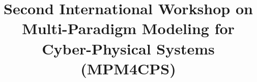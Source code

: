 
\newif\iflncs
\lncstrue

\iflncs
    
\else
    
\fi



\title{Second International Workshop on Multi-Paradigm Modeling for Cyber-Physical Systems ({MPM4CPS})}
\iflncs
\fi

\iflncs
    \author{}
    \institute{}
\else
    \author{Simon Van Mierlo}
    \affiliation{%
      \institution{University of Antwerp - Flanders Make vzw}
      \country{Belgium}
    }
    \email{simon.vanmierlo@uantwerpen.be}
    
    \author{Eugene Syriani}
    \affiliation{%
      \institution{Universit\'e de Montr\'eal}
      \country{Canada}
    }
    \email{syriani@iro.umontreal.ca}
    
    \author{Manuel Wimmer}
    \affiliation{%
      \institution{JKU Linz}
      \country{Austria}
    }
    \email{wimmer@big.tuwien.ac.at}
    
    \author{Dominique Blouin}
    \affiliation{%
        \institution{T\'el\'ecom ParisTech}
        \country{France}
    }
    \email{dominique.blouin@telecom-paristech.fr}
    
    \author{Moussa Amrani}
    \affiliation{%
        \institution{Universit\'e de Namur}
        \country{Belgium}
    }
    \email{Moussa.Amrani@unamur.be}
    
    \author{Julien Deantoni}
    \affiliation{%
        \institution{Universit\'e Nice - Sophia Antipolis}
        \country{France}
    }
    \email{julien.deantoni@univ-cotedazur.fr}
    
    \author{Hans Vangheluwe}
    \affiliation{%
      \institution{University of Antwerp - Flanders Make vzw}
    }
    \affiliation{%
        \institution{McGill University}
        \country{Canada}
    }
    \email{hans.vangheluwe@uantwerpen.be}
 
    \author{Pieter Mosterman}
    \affiliation{%
      \institution{The Mathworks}
    }
    \email{Pieter.Mosterman@mathworks.com}
   
    \author{Jeff Gray}
    \affiliation{%
        \institution{University of Alabama }
        \country{USA}
    }
    \email{gray@cs.ua.edu}
    
    \author{Vasco Amaral}
    \affiliation{%
        \institution{Universidade NOVA de Lisboa}
        \country{Portugal}
    }
    \email{vasco.amaral@fct.unl.pt}
    \renewcommand{\shortauthors}{Van Mierlo, Syriani, Wimmer, Blouin, Amrani, Deantoni, Vangheluwe, Gray, Amaral}
\fi

